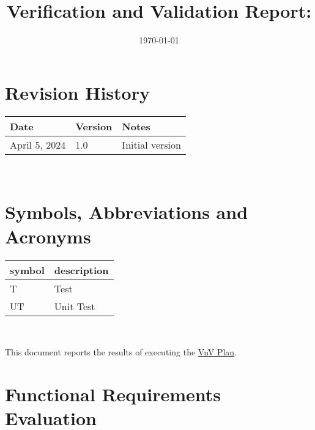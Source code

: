 \documentclass[12pt, titlepage]{article}
\begin{document}
\title{Verification and Validation Report: \progname}
\author{\authname}
\date{\today}

\maketitle


\section{Revision History}

\begin{tabularx}{\textwidth}{p{3cm}p{2cm}X} \toprule {\bf Date} & {\bf Version} & {\bf Notes}\\
\midrule
April 5, 2024 & 1.0 & Initial version\\
\bottomrule
\end{tabularx}

~\newpage

\section{Symbols, Abbreviations and Acronyms}

\renewcommand{\arraystretch}{1.2}
\begin{tabular}{l l}
  \toprule
  \textbf{symbol} & \textbf{description}\\
  \midrule
  T & Test\\
  UT & Unit Test \\
  \bottomrule
\end{tabular}\\


\newpage

\tableofcontents

\listoftables %


\newpage


This document reports the results of executing the
\href{https://github.com/adrian-soch/attitude_check/blob/main/docs/VnVPlan/VnVPlan.pdf}{VnV Plan}.

\section{Functional Requirements Evaluation}
\end{document}
